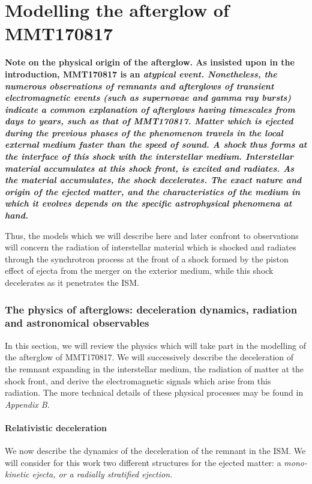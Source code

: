 \part{Modelling the afterglow of MMT170817}

\bf{Note on the physical origin of the afterglow.} As insisted upon in the introduction, MMT170817 is an \it{atypical} event. Nonetheless, the numerous observations of remnants and afterglows of transient electromagnetic events (such as supernovae and gamma ray bursts) indicate a common explanation of afterglows having timescales from days to years, such as that of MMT170817. Matter which is ejected during the previous phases of the phenomenon travels in the local external medium faster than the speed of sound. A shock thus forms at the interface of this shock with the interstellar medium. Interstellar material accumulates at this shock front, is excited and radiates. As the material accumulates, the shock decelerates. The exact nature and origin of the ejected matter, and the characteristics of the medium in which it evolves depends on the specific astrophysical phenomena at hand.

Thus, the models which we will describe here and later confront to observations will concern the radiation of interstellar material which is shocked and radiates through the synchrotron process at the front of a shock formed by the piston effect of ejecta from the merger on the exterior medium, while this shock decelerates as it penetrates the ISM.

\section{The physics of afterglows: deceleration dynamics, radiation and astronomical observables}

In this section, we will review the physics which will take part in the modelling of the afterglow of MMT170817. We will successively describe the deceleration of the remnant expanding in the interstellar medium, the radiation of matter at the shock front, and derive the electromagnetic signals which arise from this radiation. The more technical details of these physical processes may be found in \it{Appendix B}.

\subsection{Relativistic deceleration}
\label{dynamic}
We now describe the dynamics of the deceleration of the remnant in the ISM. We will consider for this work two different structures for the ejected matter: a \it{mono-kinetic ejecta}, or a \it{radially stratified ejection}.

